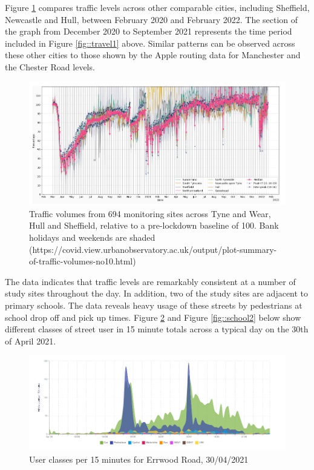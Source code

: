 \documentclass{article}
\begin{document}
\noindent Figure \ref{fig::travel2} compares traffic levels across other comparable cities, including Sheffield, Newcastle and Hull, between February 2020 and February 2022. The section of the graph from December 2020 to September 2021 represents the time period included in Figure \ref{fig::travel1} above. Similar patterns can be observed across these other cities to those shown by the Apple routing data for Manchester and the Chester Road levels.\\

\begin{figure}
	\centering
	\includegraphics[width=0.95\linewidth]{Figures/routing_newcastle.png}
	\caption{Traffic volumes from 694 monitoring sites across Tyne and Wear, Hull and Sheffield, relative to a pre-lockdown baseline of 100.
Bank holidays and weekends are shaded (https://covid.view.urbanobservatory.ac.uk/output/plot-summary-of-traffic-volumes-no10.html)} \label{fig::travel2}
\end{figure}

\noindent The data indicates that traffic levels are remarkably consistent at a number of study sites throughout the day. In addition, two of the study sites are adjacent to primary schools. The data reveals heavy usage of these streets by pedestrians at school drop off and pick up times. Figure \ref{fig::school1} and Figure \ref{fig::school2} below show different classes of street user in 15 minute totals across a typical day on the 30th of April 2021.\\

\begin{figure}
	\centering
	\includegraphics[width=0.95\linewidth]{Figures/mobility_school.png}
	\caption{User classes per 15 minutes for Errwood Road, 30/04/2021} \label{fig::school1}
\end{figure}
\end{document}
